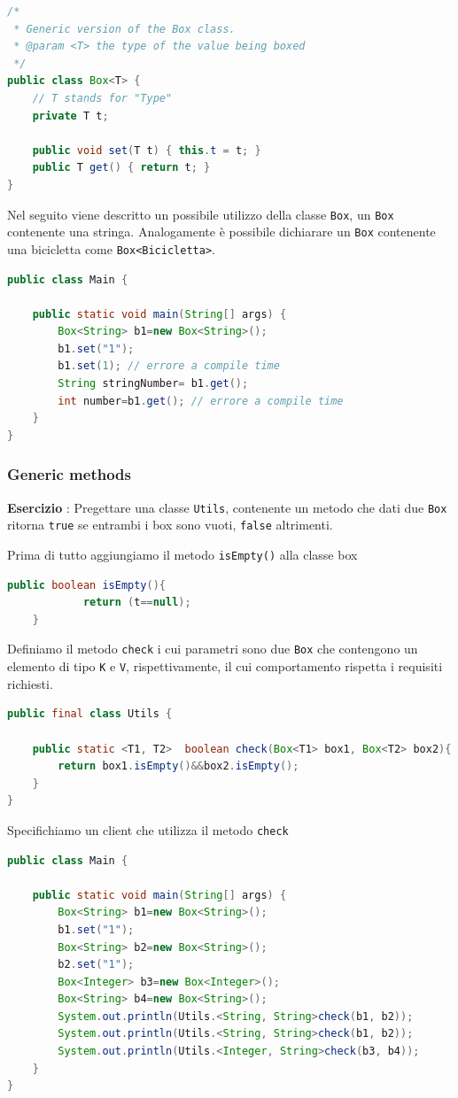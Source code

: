 \documentclass{article}
\begin{document}
\begin{lstlisting}[language=Java]
/*
 * Generic version of the Box class.
 * @param <T> the type of the value being boxed
 */
public class Box<T> {
    // T stands for "Type"
    private T t;

    public void set(T t) { this.t = t; }
    public T get() { return t; }
}
\end{lstlisting}
Nel seguito viene descritto un possibile utilizzo della classe \texttt{Box}, un \texttt{Box} contenente una stringa. Analogamente \`e possibile dichiarare un \texttt{Box} contenente una bicicletta come \texttt{Box<Bicicletta>}.
\begin{lstlisting}[language=Java]
public class Main {

	public static void main(String[] args) {
		Box<String> b1=new Box<String>();
		b1.set("1");
		b1.set(1); // errore a compile time
		String stringNumber= b1.get();
		int number=b1.get(); // errore a compile time
	}
}
\end{lstlisting}

\subsubsection{Generic methods}
\begin{framed}
\textbf{Esercizio }: Pregettare una classe \texttt{Utils}, contenente un metodo che dati due \texttt{Box} ritorna \texttt{true} se entrambi i box sono vuoti, \texttt{false} altrimenti.
\end{framed}
Prima di tutto aggiungiamo il metodo \texttt{isEmpty()} alla classe box
\begin{lstlisting}[language=Java]
public boolean isEmpty(){
    		return (t==null);
    }
\end{lstlisting}

Definiamo il metodo \texttt{check} i cui parametri sono due \texttt{Box} che contengono un elemento di tipo \texttt{K} e \texttt{V}, rispettivamente, il cui comportamento rispetta i requisiti richiesti.
\begin{lstlisting}[language=Java]
public final class Utils {

	public static <T1, T2>  boolean check(Box<T1> box1, Box<T2> box2){
		return box1.isEmpty()&&box2.isEmpty();
	}
}
\end{lstlisting}
Specifichiamo un client che utilizza il metodo \texttt{check}
\begin{lstlisting}[language=Java]
public class Main {

	public static void main(String[] args) {
		Box<String> b1=new Box<String>();
		b1.set("1");
		Box<String> b2=new Box<String>();
		b2.set("1");
		Box<Integer> b3=new Box<Integer>();
		Box<String> b4=new Box<String>();
		System.out.println(Utils.<String, String>check(b1, b2));
		System.out.println(Utils.<String, String>check(b1, b2));
		System.out.println(Utils.<Integer, String>check(b3, b4));
	}
}
\end{lstlisting}
\end{document}
